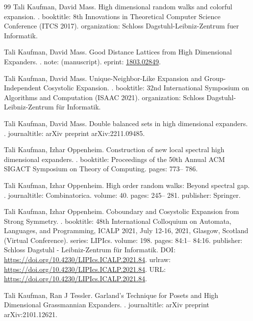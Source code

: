 \begin{thebibliography}{99}
Tali Kaufman, David Mass.
\newblock High dimensional random walks and colorful expansion.
.
\newblock booktitle: 8th Innovations in Theoretical Computer Science Conference (ITCS 2017).
\newblock organization: Schloss Dagstuhl-Leibniz-Zentrum fuer Informatik.

Tali Kaufman, David Mass.
\newblock Good Distance Lattices from High Dimensional Expanders.
.
\newblock note: (manuscript).
\newblock eprint: \url{1803.02849}.

Tali Kaufman, David Mass.
\newblock Unique-Neighbor-Like Expansion and Group-Independent Cosystolic Expansion.
.
\newblock booktitle: 32nd International Symposium on Algorithms and Computation (ISAAC 2021).
\newblock organization: Schloss Dagstuhl-Leibniz-Zentrum für Informatik.

Tali Kaufman, David Mass.
\newblock Double balanced sets in high dimensional expanders.
.
\newblock journaltitle: arXiv preprint arXiv:2211.09485.

Tali Kaufman, Izhar Oppenheim.
\newblock Construction of new local spectral high dimensional expanders.
.
\newblock booktitle: Proceedings of the 50th Annual ACM SIGACT Symposium on Theory of Computing.
\newblock pages: 773-- 786.

Tali Kaufman, Izhar Oppenheim.
\newblock High order random walks: Beyond spectral gap.
.
\newblock journaltitle: Combinatorica.
\newblock volume: 40.
\newblock pages: 245-- 281.
\newblock publisher: Springer.

Tali Kaufman, Izhar Oppenheim.
\newblock Coboundary and Cosystolic Expansion from Strong Symmetry.
.
\newblock booktitle: 48th International Colloquium on Automata, Languages, and Programming, {ICALP} 2021, July 12-16, 2021, Glasgow, Scotland (Virtual Conference).
\newblock series: LIPIcs.
\newblock volume: 198.
\newblock pages: 84:1-- 84:16.
\newblock publisher: Schloss Dagstuhl - Leibniz-Zentrum für Informatik.
\newblock DOI: \url{https://doi.org/10.4230/LIPIcs.ICALP.2021.84}.
\newblock urlraw: \url{https://doi.org/10.4230/LIPIcs.ICALP.2021.84}.
\newblock URL: \url{https://doi.org/10.4230/LIPIcs.ICALP.2021.84}.

Tali Kaufman, Ran J Tessler.
\newblock Garland's Technique for Posets and High Dimensional Grassmannian Expanders.
.
\newblock journaltitle: arXiv preprint arXiv:2101.12621.


\end{thebibliography}
